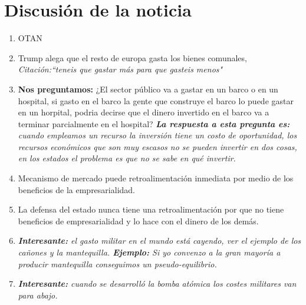 \section{Discusión de la noticia}
\begin{enumerate}
    \item OTAN 
    \item Trump alega que el resto de europa gasta los bienes comunales, \emph{Citación:``teneis que gastar más para que gasteis menos"}
    \item \textbf{Nos preguntamos:} ¿El sector público va a gastar en un barco o en un hospital, si gasto en el barco la gente que construye el barco lo puede gastar en un horpital, podria decirse que el dinero invertido en el barco va a terminar parcialmente en el hospital? \emph{\textbf{La respuesta a esta pregunta es: } cuando empleamos un recurso la inversión tiene un costo de oportunidad, los recursos económicos que son muy escasos no se pueden invertir en dos cosas, en los estados el problema es que no se sabe en qué invertir.}
    \item Mecanismo de mercado puede retroalimentación inmediata por medio de los beneficios de la empresarialidad.
    \item La defensa del estado nunca tiene una retroalimentación por que no tiene beneficios de empresarialidad y lo hace con el dinero de los demás.
    \item \emph{\textbf{Interesante:} el gasto militar en el mundo está cayendo, ver el ejemplo de los cañones y la mantequilla. \emph{\textbf{Ejemplo: }Si yo convenzo a la gran mayoría a producir mantequilla conseguimos un pseudo-equilibrio.}}
    \item \emph{\textbf{Interesante:} cuando se desarrolló la bomba atómica los costes militares van para abajo.}
\end{enumerate}

